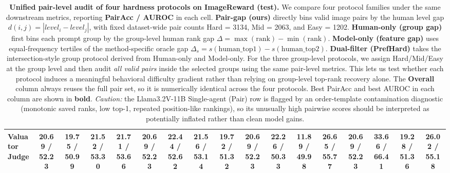 \begin{table}[!t]
{\begin{tabular}{lcccccccccccccccc}
Valuator Judge               & 20.69 / 52.23 & 19.75 / 50.99 & 21.52 / 53.30 & 21.71 / 53.66 & 20.69 / 52.23 & 22.44 / 52.62 & 21.56 / 53.14 & 19.72 / 51.32 & 20.69 / 52.23 & 22.26 / 50.33 & 11.89 / 49.98 & 26.65 / 55.77 & 20.69 / 52.23 & 33.66 / 66.41 & 19.28 / 51.36 & 26.02 / 55.18 \\
\bottomrule
\end{tabular}
}
\caption{\textbf{Unified pair-level audit of four hardness protocols on ImageReward (test).} We compare four protocol families under the same downstream metrics, reporting \textbf{PairAcc / AUROC} in each cell. \textbf{Pair-gap (ours)} directly bins valid image pairs by the human level gap $d(i,j)=|level_i-level_j|$, with fixed dataset-wide pair counts Hard = 3134, Mid = 2063, and Easy = 1202. \textbf{Human-only (group gap)} first bins each prompt group by the group-level human rank gap $\Delta = \max(\mathrm{rank}) - \min(\mathrm{rank})$. \textbf{Model-only (feature gap)} uses equal-frequency tertiles of the method-specific oracle gap $\Delta_s = s(\mathrm{human\_top1}) - s(\mathrm{human\_top2})$. \textbf{Dual-filter (PrefHard)} takes the intersection-style group protocol derived from Human-only and Model-only. For the three group-level protocols, we assign Hard/Mid/Easy at the group level and then audit \emph{all valid pairs} inside the selected groups using the same pair-level metrics. This lets us test whether each protocol induces a meaningful behavioral difficulty gradient rather than relying on group-level top-rank recovery alone. The \textbf{Overall} column always reuses the full pair set, so it is numerically identical across the four protocols. Best PairAcc and best AUROC in each column are shown in \textbf{bold}. \textit{Caution:} the Llama3.2V-11B Single-agent (Pair) row is flagged by an order-template contamination diagnostic (monotonic saved ranks, low top-1, repeated position-like rankings), so its unusually high pairwise scores should be interpreted as potentially inflated rather than clean model gains.}
\label{tab:hardness_protocols_full}
\end{table}
\FloatBarrier
